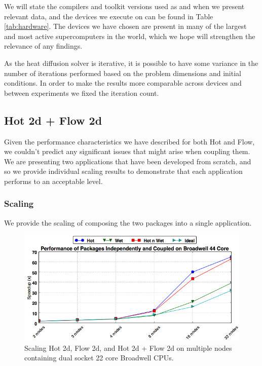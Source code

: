 \documentclass[runningheads,a4paper]{llncs}
\begin{document}
We will state the compilers and toolkit versions used as and when we present relevant data, and the devices we execute on can be found in Table \ref{tab:hardware}. The devices we have chosen are present in many of the largest and most active supercomputers in the world, which we hope will strengthen the relevance of any findings.

As the heat diffusion solver is iterative, it is possible to have some variance in the number of iterations performed based on the problem dimensions and initial conditions. In order to make the results more comparable across devices and between experiments we fixed the iteration count.

\subsection{Hot 2d + Flow 2d}

Given the performance characteristics we have described for both Hot and Flow, we couldn't predict any significant issues that might arise when coupling them. We are presenting two applications that have been developed from scratch, and so we provide individual scaling results to demonstrate that each application performs to an acceptable level. 

\subsubsection{Scaling}

We provide the scaling of composing the two packages into a single application.

\begin{figure}
  \centering
  \includegraphics[width=1.0\linewidth]{cpu_results}
  \caption{Scaling Hot 2d, Flow 2d, and Hot 2d + Flow 2d on multiple nodes containing dual socket 22 core Broadwell CPUs.}
  \label{fig:scaling-hot-flow-broadwell}
\end{figure}
\end{document}
